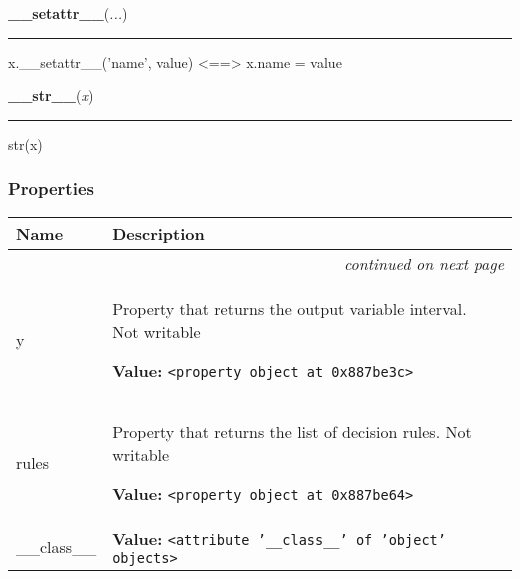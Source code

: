     \vspace{0.5ex}

    \begin{boxedminipage}{\textwidth}

    \raggedright \textbf{\_\_setattr\_\_}(\textit{...})

    \vspace{-1.5ex}

    \rule{\textwidth}{0.5\fboxrule}

x.{\_}{\_}setattr{\_}{\_}('name', value) {\textless}=={\textgreater} x.name = value
    \vspace{1ex}

    \end{boxedminipage}

    \label{object:__str__}

    \vspace{0.5ex}

    \begin{boxedminipage}{\textwidth}

    \raggedright \textbf{\_\_str\_\_}(\textit{x})

    \vspace{-1.5ex}

    \rule{\textwidth}{0.5\fboxrule}

str(x)
    \vspace{1ex}

    \end{boxedminipage}



  \subsubsection{Properties}

\begin{longtable}{|p{}|p{}|l}
\cline{1-2}
\cline{1-2} \centering \textbf{Name} & \centering \textbf{Description}& \\
\cline{1-2}
\endhead\cline{1-2}\multicolumn{3}{r}{\small\textit{continued on next page}}\\\endfoot\cline{1-2}
\endlastfoot\raggedright y\- & \raggedright Property that returns the output variable interval. Not writable

\textbf{Value:} 
{\tt {\textless}property object at 0x887be3c{\textgreater}}&\\
\cline{1-2}
\raggedright r\-u\-l\-e\-s\- & \raggedright Property that returns the list of decision rules. Not writable

\textbf{Value:} 
{\tt {\textless}property object at 0x887be64{\textgreater}}&\\
\cline{1-2}
\raggedright \_\-\_\-c\-l\-a\-s\-s\-\_\-\_\- & \raggedright \textbf{Value:} 
{\tt {\textless}attribute '\_\_class\_\_' of 'object' objects{\textgreater}}&\\
\cline{1-2}
\end{longtable}


